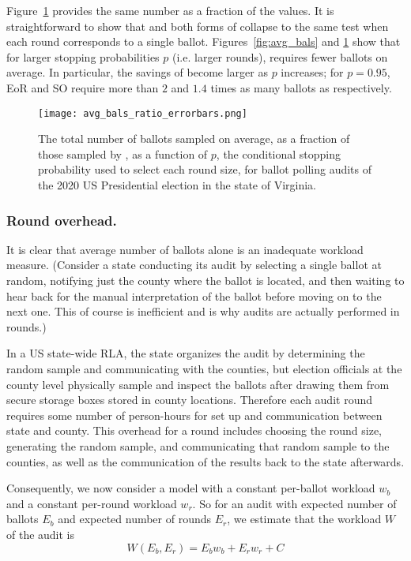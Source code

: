 Figure~\ref{fig:avg_bals_ratio} provides the same number as a fraction of the \Providence values.
It is straightforward to show that \Providence and both forms of \BRAVO collapse to the same test when each round corresponds to a single ballot. Figures~\ref{fig:avg_bals} and \ref{fig:avg_bals_ratio} show that for larger stopping probabilities $p$ (i.e. larger rounds), \Providence requires fewer ballots on average. In particular, the savings of \Providence become larger as $p$ increases; for $p=0.95$, EoR \BRAVO and SO \BRAVO require more than $2$ and $1.4$ times as many ballots as \Providence respectively. 
\begin{figure}[h!]
\texttt{[image: avg\_bals\_ratio\_errorbars.png]}
\caption{The total number of ballots sampled on average, as a fraction of those sampled by \Providence, as a function of $p$, the conditional stopping probability used to select each round size, for ballot polling audits of the 2020 US Presidential election in the state of Virginia.}
\label{fig:avg_bals_ratio}
\end{figure}


\subsubsection{Round overhead.} 
It is clear that average number of ballots alone is an inadequate workload measure. 
(Consider a state conducting its audit by selecting a single ballot at random, 
notifying just the county where the ballot is located, and then waiting to hear back for the manual interpretation of the ballot before moving on to the next one. 
This of course is inefficient and is why audits are actually performed in rounds.)

In a US state-wide RLA, the state organizes the audit by determining the random sample and communicating with the counties, but election officials at the county level physically sample and inspect the ballots after drawing them from secure storage boxes stored in county locations. 
Therefore each audit round requires some number of person-hours for set up and communication between state and county. This overhead for a round includes choosing the round size, generating the random sample, and communicating that random sample to the counties, as well as the communication of the results back to the state afterwards. 

Consequently, we now consider a model with a constant per-ballot workload $w_b$ and a constant per-round workload $w_r$.
So for an audit with expected number of ballots $E_{b}$ and expected number of rounds $E_{r}$, we estimate that the workload $W$ of the audit is
\begin{equation}
W(E_b,E_r) = E_b w_b + E_r w_r + C
\label{eq:round_workload}
\end{equation}

